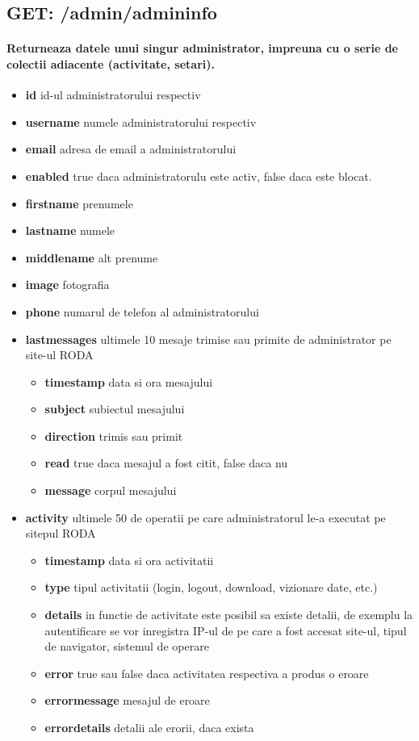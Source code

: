  \subsection*{GET: /admin/admininfo}

\paragraph{Returneaza datele unui singur administrator, impreuna cu o serie de colectii adiacente (activitate, setari).}
\begin{itemize}
\item \textbf{id}
 id-ul administratorului respectiv
\item \textbf{username}
 numele administratorului respectiv
\item \textbf{email}
 adresa de email a administratorului
\item \textbf{enabled}
 true daca administratorulu este activ, false daca este blocat. 
\item \textbf{firstname}
 prenumele
\item \textbf{lastname}
 numele
\item \textbf{middlename}
 alt prenume 
\item \textbf{image}
 fotografia
\item \textbf{phone}
 numarul de telefon al administratorului
\item\textbf{lastmessages}
 ultimele 10 mesaje trimise sau primite de administrator pe site-ul RODA \begin{itemize}
\item \textbf{timestamp}
 data si ora mesajului
\item \textbf{subject}
 subiectul mesajului
\item \textbf{direction}
 trimis sau primit
\item \textbf{read}
 true daca mesajul a fost citit, false daca nu
\item \textbf{message}
 corpul mesajului
 \end{itemize}
\item\textbf{activity}
 ultimele 50 de operatii pe care administratorul le-a executat pe sitepul RODA \begin{itemize}
\item \textbf{timestamp}
 data si ora activitatii
\item \textbf{type}
 tipul activitatii (login, logout, download, vizionare date, etc.)
\item \textbf{details}
 in functie de activitate este posibil sa existe detalii, de exemplu la autentificare se vor inregistra IP-ul de pe care a fost accesat site-ul, tipul de navigator, sistemul de operare
\item \textbf{error}
 true sau false daca activitatea respectiva a produs o eroare
\item \textbf{errormessage}
 mesajul de eroare
\item \textbf{errordetails}
 detalii ale erorii, daca exista
 \end{itemize}
 \end{itemize}

